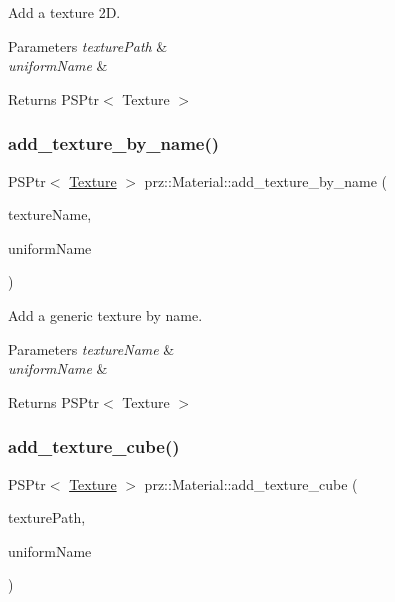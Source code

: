 Add a texture 2D. 


\begin{DoxyParams}{Parameters}
{\em texture\+Path} & \\
\hline
{\em uniform\+Name} & \\
\hline
\end{DoxyParams}
\begin{DoxyReturn}{Returns}
P\+S\+Ptr$<$ Texture $>$ 
\end{DoxyReturn}
\mbox{\label{classprz_1_1_material_a16f993fb8665220f51313df4285bca53}} 
\subsubsection{\texorpdfstring{add\_texture\_by\_name()}{add\_texture\_by\_name()}}
{\footnotesize\ttfamily P\+S\+Ptr$<$ \mbox{\hyperlink{classprz_1_1_texture}{Texture}} $>$ prz\+::\+Material\+::add\+\_\+texture\+\_\+by\+\_\+name (\begin{DoxyParamCaption}\item[{const P\+String \&}]{texture\+Name,  }\item[{const P\+String \&}]{uniform\+Name }\end{DoxyParamCaption})}



Add a generic texture by name. 


\begin{DoxyParams}{Parameters}
{\em texture\+Name} & \\
\hline
{\em uniform\+Name} & \\
\hline
\end{DoxyParams}
\begin{DoxyReturn}{Returns}
P\+S\+Ptr$<$ Texture $>$ 
\end{DoxyReturn}
\mbox{\label{classprz_1_1_material_aeecf13bf1f8c559f520a2e3400b3f7bf}} 
\subsubsection{\texorpdfstring{add\_texture\_cube()}{add\_texture\_cube()}}
{\footnotesize\ttfamily P\+S\+Ptr$<$ \mbox{\hyperlink{classprz_1_1_texture}{Texture}} $>$ prz\+::\+Material\+::add\+\_\+texture\+\_\+cube (\begin{DoxyParamCaption}\item[{const P\+String \&}]{texture\+Path,  }\item[{const P\+String \&}]{uniform\+Name }\end{DoxyParamCaption})}



